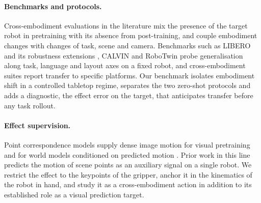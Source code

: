 \paragraph{Benchmarks and protocols.}
Cross-embodiment evaluations in the literature mix the presence of the target robot in pretraining with its absence from post-training, and couple embodiment changes with changes of task, scene and camera. Benchmarks such as LIBERO and its robustness extensions \citep{liu2023libero, zhou2025liberopro, fei2025liberoplus, wang2026liberox}, CALVIN \citep{mees2021calvin} and RoboTwin \citep{chen2025robotwin2} probe generalisation along task, language and layout axes on a fixed robot, and cross-embodiment suites report transfer to specific platforms. Our benchmark isolates embodiment shift in a controlled tabletop regime, separates the two zero-shot protocols and adds a diagnostic, the effect error on the target, that anticipates transfer before any task rollout.

\paragraph{Effect supervision.}
Point correspondence models \citep{karaev2024cotracker3} supply dense image motion for visual pretraining and for world models conditioned on predicted motion \citep{nvidia2025cosmospredict25}. Prior work in this line predicts the motion of scene points as an auxiliary signal on a single robot. We restrict the effect to the keypoints of the gripper, anchor it in the kinematics of the robot in hand, and study it as a cross-embodiment action in addition to its established role as a visual prediction target.
